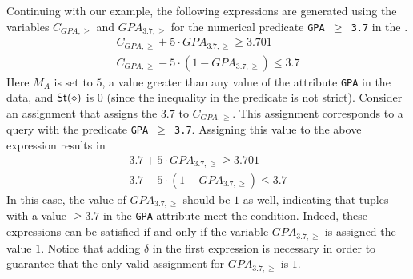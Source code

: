 \begin{example}
\label{ex:numeric_constraint}
Continuing with our example, the following expressions are generated using the variables $C_{GPA, \geq}$ and $GPA_{3.7, \geq}$ for the numerical predicate {\tt GPA $\geq$ 3.7} in the \running{}.
\begin{align*}
    C_{GPA, \geq} + 5 \cdot GPA_{3.7, \geq} \geq 3.701 \\ 
    C_{GPA, \geq} - 5 \cdot (1 - GPA_{3.7, \geq}) \leq 3.7
\end{align*}
Here $M_A$ is set to $5$, a value greater than any value of the attribute {\tt GPA} in the data, and ${\sf St}(\diamond)$ is $0$ (since the inequality in the predicate is not strict). Consider an assignment that assigns the $3.7$ to $C_{GPA, \geq}$. This assignment corresponds to a query with the predicate {\tt GPA $\geq$ 3.7}. Assigning this value to the above expression results in 
\begin{align*}
    3.7 + 5 \cdot GPA_{3.7, \geq} \geq 3.701 \\ 
    3.7 - 5 \cdot (1 - GPA_{3.7, \geq}) \leq 3.7
\end{align*}
In this case, the value of $GPA_{3.7, \geq}$ should be $1$ as well, indicating that tuples with a value $\geq 3.7$ in the {\tt GPA} attribute meet the condition. Indeed, these expressions can be satisfied if and only if the variable $GPA_{3.7, \geq}$ is assigned the value $1$. Notice that adding $\delta$ in the first expression is necessary in order to guarantee that the only valid assignment for $GPA_{3.7, \geq}$ is $1$. 



\end{example}




